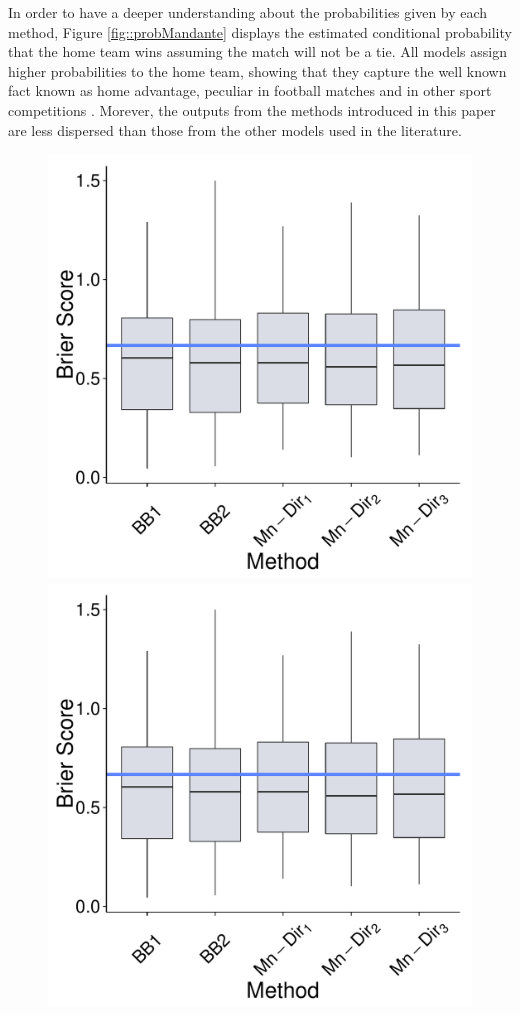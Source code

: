 \documentclass[journal,article,accept,moreauthors,pdftex,12pt,a4paper]{mdpi}
\begin{document}
	In order to have a deeper understanding about the probabilities
	given by each method, Figure \ref{fig::probMandante} displays the
	estimated conditional probability that the home team wins assuming
	the match will not be a tie.
	All models assign higher probabilities to the home team, showing that they capture the well known fact known as home advantage, peculiar in football matches and in other sport competitions \cite{Pollard86, Clarke95, Nevill99}.
	Morever, the outputs from the methods introduced in this paper are
	less dispersed than those from the other models used in the
	literature.
	
	
	\begin{figure}[H] \centering
		\includegraphics[page=5,scale=0.3]{futebolComparacaoModelosForPaper.pdf}
		\includegraphics[page=6,scale=0.3]{futebolComparacaoModelosForPaper.pdf}\\

\end{figure}
\end{document}
